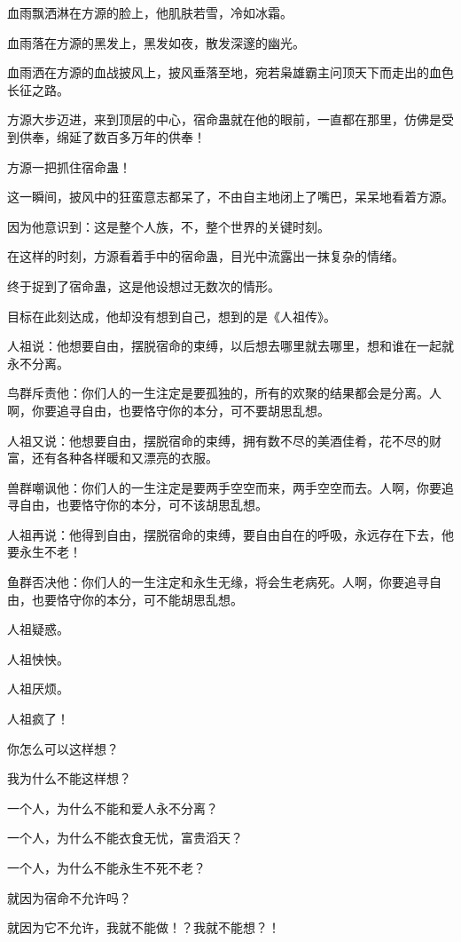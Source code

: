 \begin{this_body}
血雨飘洒淋在方源的脸上，他肌肤若雪，冷如冰霜。

血雨落在方源的黑发上，黑发如夜，散发深邃的幽光。

血雨洒在方源的血战披风上，披风垂落至地，宛若枭雄霸主问顶天下而走出的血色长征之路。

方源大步迈进，来到顶层的中心，宿命蛊就在他的眼前，一直都在那里，仿佛是受到供奉，绵延了数百多万年的供奉！

方源一把抓住宿命蛊！

这一瞬间，披风中的狂蛮意志都呆了，不由自主地闭上了嘴巴，呆呆地看着方源。

因为他意识到：这是整个人族，不，整个世界的关键时刻。

在这样的时刻，方源看着手中的宿命蛊，目光中流露出一抹复杂的情绪。

终于捉到了宿命蛊，这是他设想过无数次的情形。

目标在此刻达成，他却没有想到自己，想到的是《人祖传》。

人祖说：他想要自由，摆脱宿命的束缚，以后想去哪里就去哪里，想和谁在一起就永不分离。

鸟群斥责他：你们人的一生注定是要孤独的，所有的欢聚的结果都会是分离。人啊，你要追寻自由，也要恪守你的本分，可不要胡思乱想。

人祖又说：他想要自由，摆脱宿命的束缚，拥有数不尽的美酒佳肴，花不尽的财富，还有各种各样暖和又漂亮的衣服。

兽群嘲讽他：你们人的一生注定是要两手空空而来，两手空空而去。人啊，你要追寻自由，也要恪守你的本分，可不该胡思乱想。

人祖再说：他得到自由，摆脱宿命的束缚，要自由自在的呼吸，永远存在下去，他要永生不老！

鱼群否决他：你们人的一生注定和永生无缘，将会生老病死。人啊，你要追寻自由，也要恪守你的本分，可不能胡思乱想。

人祖疑惑。

人祖怏怏。

人祖厌烦。

人祖疯了！

你怎么可以这样想？

我为什么不能这样想？

一个人，为什么不能和爱人永不分离？

一个人，为什么不能衣食无忧，富贵滔天？

一个人，为什么不能永生不死不老？

就因为宿命不允许吗？

就因为它不允许，我就不能做！？我就不能想？！


\end{this_body}
